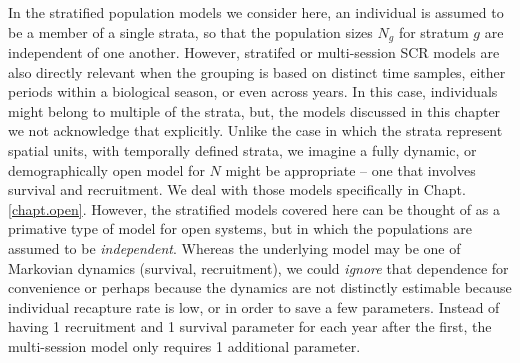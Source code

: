 In the stratified population models we consider here, an individual is
assumed to be a member of a single strata, so that the population
sizes $N_{g}$ for stratum $g$ are independent of one another. However,
stratifed or multi-session SCR models are also directly relevant when
the grouping is based on distinct time samples, either periods within
a biological season, or even across years. In this case, individuals
might belong to multiple of the strata, but, the models discussed in
this chapter we not acknowledge that explicitly.
Unlike the case in which the strata represent spatial units, with
temporally defined strata, we imagine a fully dynamic, or
demographically open model for $N$ might be appropriate -- one that
involves survival and recruitment. We deal with those models
specifically in Chapt. \ref{chapt.open}.  However, the stratified
models covered here can be thought of as a primative type of model for
open systems, but in which the populations are assumed to be {\it
  independent}. Whereas the underlying model may be one of Markovian
dynamics (survival, recruitment), we could {\it ignore} that
dependence for convenience or perhaps because the dynamics are not
distinctly estimable because individual recapture rate is low, or in
order to save a few parameters. Instead of having 1 recruitment and 1
survival parameter for each year after the first, the multi-session
model only requires 1 additional parameter.

